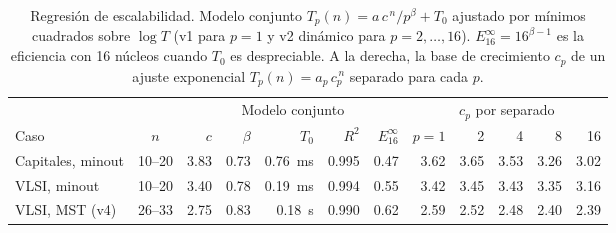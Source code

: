 \begin{table}[H]
\centering
\caption{Regresión de escalabilidad. Modelo conjunto $T_p(n) = a\,c^{\,n}/p^{\beta} + T_0$ ajustado por mínimos cuadrados sobre $\log T$ (v1 para $p=1$ y v2 dinámico para $p = 2, \dots, 16$). $E_{16}^{\infty} = 16^{\beta-1}$ es la eficiencia con 16 núcleos cuando $T_0$ es despreciable. A la derecha, la base de crecimiento $c_p$ de un ajuste exponencial $T_p(n) = a_p\,c_p^{\,n}$ separado para cada $p$.}
\label{tab:regresion}
\small
\setlength{\tabcolsep}{4pt}
\begin{tabular}{lcrrrrr|rrrrr}
\toprule
 & & \multicolumn{5}{c|}{Modelo conjunto} & \multicolumn{5}{c}{$c_p$ por separado} \\
Caso & $n$ & $c$ & $\beta$ & $T_0$ & $R^2$ & $E_{16}^{\infty}$ & $p{=}1$ & 2 & 4 & 8 & 16 \\
\midrule
Capitales, minout & 10--20 & 3.83 & 0.73 & 0.76~ms & 0.995 & 0.47 & 3.62 & 3.65 & 3.53 & 3.26 & 3.02 \\
VLSI, minout & 10--20 & 3.40 & 0.78 & 0.19~ms & 0.994 & 0.55 & 3.42 & 3.45 & 3.43 & 3.35 & 3.16 \\
VLSI, MST (v4) & 26--33 & 2.75 & 0.83 & 0.18~s & 0.990 & 0.62 & 2.59 & 2.52 & 2.48 & 2.40 & 2.39 \\
\bottomrule
\end{tabular}
\end{table}
